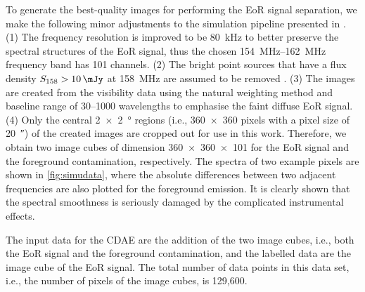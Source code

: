 \documentclass[letters,a4paper,fleqn,usenatbib]{mnras}
\begin{document}
To generate the best-quality images for performing the EoR signal
separation, we make the following minor adjustments to the simulation
pipeline presented in \citet{li2018}.
(1) The frequency resolution is improved to be \SI{80}{\kHz} to better
preserve the spectral structures of the EoR signal, thus the chosen
\SIrange{154}{162}{\MHz} frequency band has 101 channels.
(2) The bright point sources that have a flux density
$S_{158} > \SI{10}{\mJy}$ at \SI{158}{\MHz} are assumed to be
removed \citep[e.g.,][]{liu2009ps}.
(3) The images are created from the visibility data using the natural
weighting method and baseline range of \numrange{30}{1000} wavelengths
to emphasise the faint diffuse EoR signal.
(4) Only the central \SI[product-units=repeat]{2 x 2}{\degree} regions
(i.e., \num{360 x 360} pixels with a pixel size of \SI{20}{\arcsecond})
of the created images are cropped out for use in this work.
Therefore, we obtain two image cubes of dimension \num{360 x 360 x 101}
for the EoR signal and the foreground contamination, respectively.
The spectra of two example pixels are shown in \autoref{fig:simudata},
where the absolute differences between two adjacent frequencies are
also plotted for the foreground emission.
It is clearly shown that the spectral smoothness is seriously damaged
by the complicated instrumental effects.

The input data for the CDAE are the addition of the two image cubes,
i.e., both the EoR signal and the foreground contamination,
and the labelled data are the image cube of the EoR signal.
The total number of data points in this data set, i.e., the number of
pixels of the image cubes, is 129,600.
\end{document}
